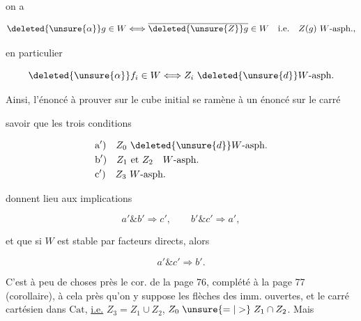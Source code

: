 
on a

\[
\deleted{\unsure{\alpha}}g\in W\Longleftrightarrow\overline{\deleted{\unsure{Z}}g}\in W\quad\text{i.e.}\quad Z(g)\ W\text{-asph.},
\]

en particulier

\[
\deleted{\unsure{\alpha}}f_i\in W\Longleftrightarrow Z_i\ \deleted{\unsure{d}}W\text{-asph.}
\]

Ainsi, l'énoncé à prouver sur le cube initial se ramène à  un énoncé  sur le carré


savoir que les trois conditions

\[
\begin{aligned}
&\text{a}')\quad Z_0\ \deleted{\unsure{d}}W\text{-asph.}\\
&\text{b}')\quad Z_1\text{ et }Z_2\quad W\text{-asph.}\\
&\text{c}')\quad Z_3\ W\text{-asph.}
\end{aligned}
\]

donnent lieu aux implications

\[
a'\mathbin{\&}b'\Longrightarrow c',\qquad b'\mathbin{\&}c'\Longrightarrow a',
\]

et que si $W$ est stable par facteurs directs, alors

\[
a'\mathbin{\&}c'\Longrightarrow b'.
\]

C'est à peu de choses près le cor. de la page 76, complété à la page 77 (corollaire), à cela près qu'on y suppose les flèches des imm. ouvertes, et le carré cartésien  dans $\mathrm{Cat}$, \uline{i.e.} $Z_3=Z_1\cup Z_2$, $Z_0\mathrel{\unsure{=|>}}Z_1\cap Z_2$. Mais
